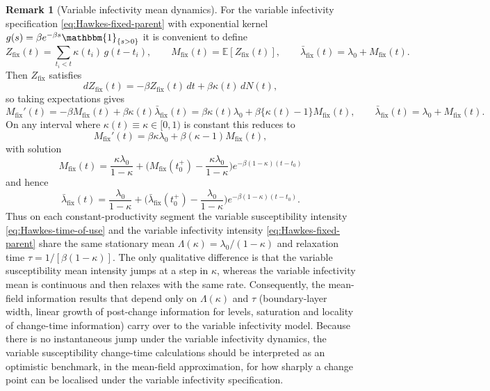 \documentclass{article}
\theoremstyle{plain}
\theoremstyle{definition}
\newtheorem{remark}[theorem]{Remark}
\newcommand{\E}{\mathbb{E}}
\newcommand{\1}{\mathbf{1}}
\begin{document}
    \begin{remark}[Variable infectivity mean dynamics]
    \label{rem:fixed-parent-mf}
    For the variable infectivity specification \eqref{eq:Hawkes-fixed-parent} with exponential kernel $g(s)=\beta e^{-\beta s}\mathbbm{1}_{\{s>0\}}$ it is convenient to define
    \[
    Z_{\mathrm{fix}}(t)
    =\sum_{t_i<t}\kappa(t_i)\,g(t-t_i),\qquad
    M_{\mathrm{fix}}(t)=\E[Z_{\mathrm{fix}}(t)],\qquad
    \bar\lambda_{\mathrm{fix}}(t)=\lambda_0+M_{\mathrm{fix}}(t).
    \]
    Then $Z_{\mathrm{fix}}$ satisfies
    \[
    dZ_{\mathrm{fix}}(t)
    =-\beta Z_{\mathrm{fix}}(t)\,dt+\beta\kappa(t)\,dN(t),
    \]
    so taking expectations gives
    \[
    M_{\mathrm{fix}}'(t)
    =-\beta M_{\mathrm{fix}}(t)+\beta\kappa(t)\bar\lambda_{\mathrm{fix}}(t)
    =\beta\kappa(t)\lambda_0+\beta\{\kappa(t)-1\}M_{\mathrm{fix}}(t),
    \qquad
    \bar\lambda_{\mathrm{fix}}(t)=\lambda_0+M_{\mathrm{fix}}(t).
    \]
    On any interval where $\kappa(t)\equiv\kappa\in[0,1)$ is constant this reduces to
    \[
    M_{\mathrm{fix}}'(t)=\beta\kappa\lambda_0+\beta(\kappa-1)M_{\mathrm{fix}}(t),
    \]
    with solution
    \[
    M_{\mathrm{fix}}(t)
    =\frac{\kappa\lambda_0}{1-\kappa}
    +\Big(M_{\mathrm{fix}}(t_0^+)-\frac{\kappa\lambda_0}{1-\kappa}\Big)
    e^{-\beta(1-\kappa)(t-t_0)}
    \]
    and hence
    \[
    \bar\lambda_{\mathrm{fix}}(t)
    =\frac{\lambda_0}{1-\kappa}
    +\Big(\bar\lambda_{\mathrm{fix}}(t_0^+)-\frac{\lambda_0}{1-\kappa}\Big)
    e^{-\beta(1-\kappa)(t-t_0)}.
    \]
    Thus on each constant-productivity segment the variable susceptibility intensity \eqref{eq:Hawkes-time-of-use} and the variable infectivity intensity \eqref{eq:Hawkes-fixed-parent} share the same stationary mean $\Lambda(\kappa)=\lambda_0/(1-\kappa)$ and relaxation time $\tau=1/[\beta(1-\kappa)]$. The only qualitative difference is that the variable susceptibility mean intensity jumps at a step in $\kappa$, whereas the variable infectivity mean is continuous and then relaxes with the same rate. Consequently, the mean-field information results that depend only on $\Lambda(\kappa)$ and $\tau$ (boundary-layer width, linear growth of post-change information for levels, saturation and locality of change-time information) carry over to the variable infectivity model. Because there is no instantaneous jump under the variable infectivity dynamics, the variable susceptibility change-time calculations should be interpreted as an optimistic benchmark, in the mean-field approximation, for how sharply a change point can be localised under the variable infectivity specification.
    \end{remark}
    
\end{document}
